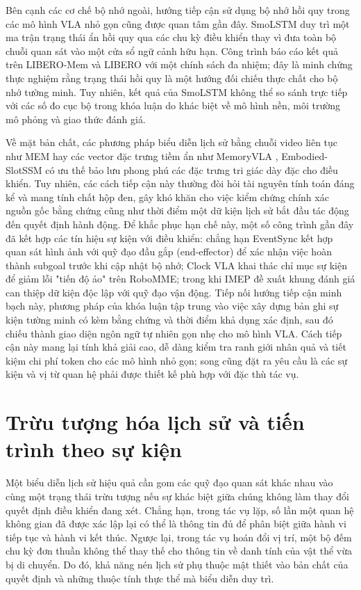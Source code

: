 Bên cạnh các cơ chế bộ nhớ ngoài, hướng tiếp cận sử dụng bộ nhớ hồi quy trong các mô hình VLA nhỏ gọn cũng được quan tâm gần đây. SmoLSTM \cite{smoLSTM2026} duy trì một ma trận trạng thái ẩn hồi quy qua các chu kỳ điều khiển thay vì đưa toàn bộ chuỗi quan sát vào một cửa sổ ngữ cảnh hữu hạn. Công trình báo cáo kết quả trên LIBERO-Mem và LIBERO với một chính sách đa nhiệm; đây là minh chứng thực nghiệm rằng trạng thái hồi quy là một hướng đối chiếu thực chất cho bộ nhớ tường minh. Tuy nhiên, kết quả của SmoLSTM không thể so sánh trực tiếp với các số đo cục bộ trong khóa luận do khác biệt về mô hình nền, môi trường mô phỏng và giao thức đánh giá.

Về mặt bản chất, các phương pháp biểu diễn lịch sử bằng chuỗi video liên tục như MEM \cite{mem2026} hay các vector đặc trưng tiềm ẩn như MemoryVLA \cite{memoryvla2026}, Embodied-SlotSSM \cite{liberomem2025} có ưu thế bảo lưu phong phú các đặc trưng tri giác dày đặc cho điều khiển. Tuy nhiên, các cách tiếp cận này thường đòi hỏi tài nguyên tính toán đáng kể và mang tính chất hộp đen, gây khó khăn cho việc kiểm chứng chính xác nguồn gốc bằng chứng cũng như thời điểm một dữ kiện lịch sử bắt đầu tác động đến quyết định hành động. Để khắc phục hạn chế này, một số công trình gần đây đã kết hợp các tín hiệu sự kiện với điều khiển: chẳng hạn EventSync \cite{eventsync2026} kết hợp quan sát hình ảnh với quỹ đạo đầu gắp (end-effector) để xác nhận việc hoàn thành subgoal trước khi cập nhật bộ nhớ; Clock VLA \cite{clockvla2026} khai thác chỉ mục sự kiện để giảm lỗi "tiến độ ảo" trên RoboMME; trong khi IMEP \cite{imep2026} đề xuất khung đánh giá can thiệp dữ kiện độc lập với quỹ đạo vận động. Tiếp nối hướng tiếp cận minh bạch này, phương pháp của khóa luận tập trung vào việc xây dựng bản ghi sự kiện tường minh có kèm bằng chứng và thời điểm khả dụng xác định, sau đó chiếu thành giao diện ngôn ngữ tự nhiên gọn nhẹ cho mô hình VLA. Cách tiếp cận này mang lại tính khả giải cao, dễ dàng kiểm tra ranh giới nhân quả và tiết kiệm chi phí token cho các mô hình nhỏ gọn; song cũng đặt ra yêu cầu là các sự kiện và vị từ quan hệ phải được thiết kế phù hợp với đặc thù tác vụ.

\section{Trừu tượng hóa lịch sử và tiến trình theo sự kiện}

Một biểu diễn lịch sử hiệu quả cần gom các quỹ đạo quan sát khác nhau vào cùng một trạng thái trừu tượng nếu sự khác biệt giữa chúng không làm thay đổi quyết định điều khiển đang xét. Chẳng hạn, trong tác vụ lặp, số lần một quan hệ không gian đã được xác lập lại có thể là thông tin đủ để phân biệt giữa hành vi tiếp tục và hành vi kết thúc. Ngược lại, trong tác vụ hoán đổi vị trí, một bộ đếm chu kỳ đơn thuần không thể thay thế cho thông tin về danh tính của vật thể vừa bị di chuyển. Do đó, khả năng nén lịch sử phụ thuộc mật thiết vào bản chất của quyết định và những thuộc tính thực thể mà biểu diễn duy trì.

